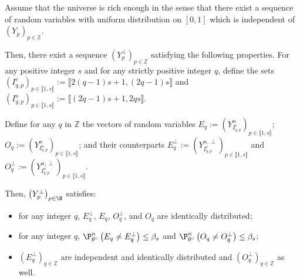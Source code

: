 \begin{lm}\label{AS_DEPENDENTDATA_RICHSPACE}
Assume that the universe is rich enough in the sense that there exist a sequence of random variables with uniform distribution on $[0,1]$ which is independent of $(Y_{p})_{p \in \mathds{Z}}$.

Then, there exist a sequence $(Y_{p}^{\perp})_{p \in \mathds{Z}}$ satisfying the following properties.
For any positive integer $s$ and for any strictly positive integer $q$, define the sets $(I_{q, p}^{e})_{p \in \llbracket 1, s\rrbracket} := \llbracket 2(q-1) s + 1, (2q - 1) s\rrbracket$ and $\left(I_{q, p}^{o}\right)_{p \in \llbracket 1, s \rrbracket} := \llbracket (2q-1) s + 1, 2q s\rrbracket$.

Define for any $q$ in $\mathds{Z}$ the vectors of random variables $E_{q} := (Y_{I_{q, p}^{e}}^{n})_{p \in \llbracket 1, s \rrbracket}$; $O_{q} := (Y_{I_{q, p}^{o}}^{n})_{p \in \llbracket 1, s \rrbracket}$; and their counterparts $E_{q}^{\perp} := (Y_{I_{q, p}^{e}}^{n, \perp})_{p \in \llbracket 1, s \rrbracket}$ and $O_{q}^{\perp} := (Y_{I_{q, p}^{o}}^{n, \perp})_{p \in \llbracket 1, s \rrbracket}$.

Then, $\left(Y^{\perp}_{p}\right)_{p \in \N}$ satisfies:
\begin{itemize}
\item for any integer $q$, $E^{\perp}_{q}$, $E_{q}$, $O^{\perp}_{q}$, and $O_{q}$ are identically distributed;
\item for any integer $q$, $\P_{\theta^{\circ}}^{n}\left(E_{q} \neq E^{\perp}_{q}\right) \leq \beta_{s}$ and $\P_{\theta^{\circ}}^{n}\left(O_{q} \neq O^{\perp}_{q}\right) \leq \beta_{s}$;
\item $\left(E^{\perp}_{q}\right)_{q \in \mathds{Z}}$ are independent and identically distributed and $\left(O^{\perp}_{q}\right)_{q \in \mathds{Z}}$ as well.
\end{itemize}
\end{lm}


